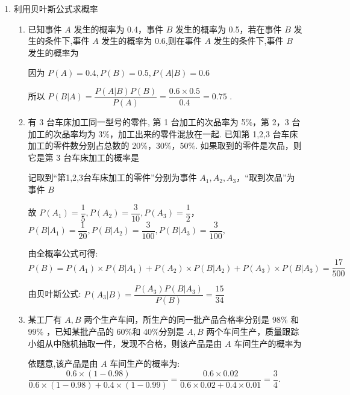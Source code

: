 \begin{enumerate}
\begin{enumerate}
    \end{enumerate}
    \item 利用贝叶斯公式求概率
    \begin{enumerate}
        \item 已知事件 $A$ 发生的概率为 0.4，事件 $B$ 发生的概率为 0.5，若在事件 $B$ 发生的条件下,事件 $A$ 发生的概率为 0.6,则在事件 $A$ 发生的条件下,事件 $B$ 发生的概率为
        \begin{jieda}
            因为 $P\left( A\right)  = {0.4},P\left( B\right)  = {0.5},P\left( {A|B}\right) = {0.6}$
            
            所以 $P\left( {B|A}\right)  = \dfrac{P\left( {A|B}\right) P(B) }{P\left( A\right) } = \dfrac{0.6 \times 0.5}{0.4} = {0.75}$ .
        \end{jieda}
        \item 有 3 台车床加工同一型号的零件, 第 1 台加工的次品率为 5\%，第 2，3 台加工的次品率均为 3\%，加工出来的零件混放在一起. 已知第 1,2,3 台车床加工的零件数分别占总数的 20\%，30\%，50\%. 如果取到的零件是次品，则它是第 3 台车床加工的概率是
        \begin{jieda}
            记取到“第1,2,3台车床加工的零件”分别为事件 ${A}_{1},{A}_{2},{A}_{3}$，“取到次品”为事件 $B$
            
            故 $P\left( {A}_{1}\right)  = \dfrac{1}{5},P\left( {A}_{2}\right)  = \dfrac{3}{10},P\left( {A}_{3}\right)  = \dfrac{1}{2}$，$P\left( {B|{A}_{1}}\right)  = \dfrac{1}{20},P\left( {B|{A}_{2}}\right)  = \dfrac{3}{100},P\left( {B|{A}_{3}}\right)  = \dfrac{3}{100},$
            
            由全概率公式可得: $P\left( B\right)  = P\left( {A}_{1}\right)  \times  P\left( {B|{A}_{1}}\right)  + P\left( {A}_{2}\right)  \times  P\left( {B|{A}_{2}}\right)  + P\left( {A}_{3}\right)  \times  P\left( {B|{A}_{3}}\right)  = \dfrac{17}{500}$
            
            由贝叶斯公式: $P\left( {{A}_{3}|B}\right)  = \dfrac{P\left( {A}_{3}\right) P\left( {B|{A}_{3}}\right) }{P\left( B\right) } = \dfrac{15}{34}$
        \end{jieda}
        
        \item 某工厂有 $A,B$ 两个生产车间，所生产的同一批产品合格率分别是 ${98}\%$ 和 ${99}\%$ ，已知某批产品的 60\%和 40\%分别是 $A,B$ 两个车间生产，质量跟踪小组从中随机抽取一件，发现不合格，则该产品是由 $A$ 车间生产的概率为
        \begin{jieda}
            依题意,该产品是由 $A$ 车间生产的概率为: $\dfrac{{0.6} \times  \left( {1 - {0.98}}\right) }{{0.6} \times  \left( {1 - {0.98}}\right)  + {0.4} \times  \left( {1 - {0.99}}\right) } = \dfrac{{0.6} \times  {0.02}}{{0.6} \times  {0.02} + {0.4} \times  {0.01}} = \dfrac{3}{4}.$
        \end{jieda}
        

\end{enumerate}
\end{enumerate}

